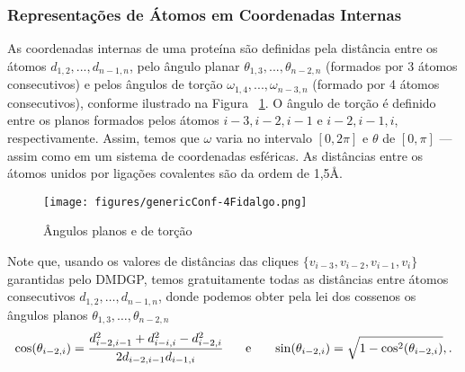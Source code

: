 \subsubsection{Representações de Átomos em Coordenadas Internas\label{sec:bi}}
As coordenadas internas de uma proteína são definidas pela distância entre os átomos $d_{1,2}, ..., d_{n - 1,n}$, pelo ângulo planar $\theta_{1,3}, ...,\theta_{n - 2,n}$ (formados por 3 átomos consecutivos) e pelos ângulos de torção $\omega_{1,4}, ..., \omega_{n-3,n}$ (formado por 4 átomos consecutivos), conforme ilustrado na Figura ~\ref{fig:angulos}. O ângulo de torção é definido entre os planos formados pelos átomos $i-3,i-2,i-1$ e $i-2,i-1,i$, respectivamente. Assim, temos que $\omega$ varia no intervalo $[0,2\pi]$ e $\theta$ de $[0,\pi]$ --- assim como em um sistema de coordenadas esféricas. As distâncias entre os átomos unidos por ligações covalentes são da ordem de 1,5\AA. 

\begin{figure}[H]
	\begin{center}
		\texttt{[image: figures/genericConf-4Fidalgo.png]}
	\end{center}
	\caption{Ângulos planos e de torção}
	\label{fig:angulos}
\end{figure}

Note que, usando os valores de distâncias das cliques $\{ v_{i-3}, v_{i-2} , v_{i-1}, v_i \}$ garantidas pelo DMDGP, temos gratuitamente todas as distâncias entre átomos consecutivos $d_{1,2}, \dots, d_{n-1, n}$, donde podemos obter pela lei dos cossenos os ângulos planos $\theta_{1,3}, \dots, \theta_{n-2, n}$ 
\begin{equation}
	\cos(\theta_{i-2,i}) 
	= 
	\dfrac{d^{2}_{i-2,i-1} + d^{2}_{i-i,i} - d^{2}_{i-2,i}}{2d_{i-2,i-1}d_{i-1,i}}
	\hspace{0.5cm} \mbox{  e  } \hspace{0.5cm}
	\sin(\theta_{i-2,i}) = \sqrt{1 - \cos^{2}(\theta_{i-2,i})},
	\label{eqcostheta}.
\end{equation} 

